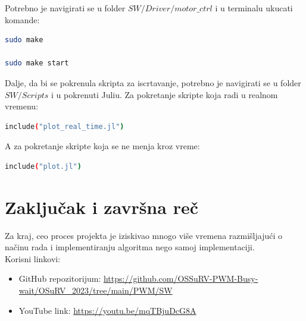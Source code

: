 \documentclass[a4paper, 11pt, titlepage]{article}
\begin{document}
Potrebno je navigirati se u folder $SW/Driver/motor\_ctrl$ i u terminalu ukucati komande: 

\begin{lstlisting}[language=bash, caption= Pokretanje programa]
sudo make 

sudo make start
\end{lstlisting}

Dalje, da bi se pokrenula skripta za iscrtavanje, potrebno je navigirati se u folder $SW/Scripts$ i u pokrenuti Juliu. Za pokretanje skripte koja radi u realnom vremenu: 
\begin{lstlisting}[language=bash, caption= Pokrtanje Julia skripte za grafik kašnjenja]
include("plot_real_time.jl")
\end{lstlisting}
A za pokretanje skripte koja se ne menja kroz vreme:
\begin{lstlisting}[language=bash, caption= Pokrtanje Julia skripte za iscrtavanje distribucije kašnjenja]
include("plot.jl")
\end{lstlisting}
\newpage
\section{Zaključak i završna reč}

Za kraj, ceo proces projekta je iziskivao mnogo više vremena razmišljajući o načinu rada i implementiranju algoritma nego samoj implementaciji. \\

Korisni linkovi:  \\

\begin{itemize}
  \item GitHub repozitorijum: \url{https://github.com/OSSuRV-PWM-Busy-wait/OSuRV_2023/tree/main/PWM/SW} 
  \item YouTube link: \url{https://youtu.be/mqTBjuDcG8A}

\end{itemize}
\end{document}
